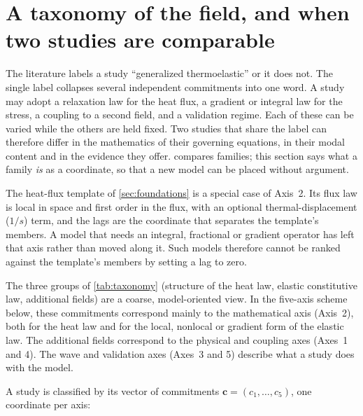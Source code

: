 \section{A taxonomy of the field, and when two studies are comparable}\label{sec:taxonomy}

The literature labels a study ``generalized thermoelastic'' or it does not. The single label collapses several independent commitments into one word. A study may adopt a relaxation law for the heat flux, a gradient or
integral law for the stress, a coupling to a second field, and a validation regime. Each of these can
be varied while the others are held fixed. Two studies that share the label can therefore differ in the
mathematics of their governing equations, in their modal content and in the evidence they offer.
 compares families; this section says what a family \emph{is} as a coordinate, so that a
new model can be placed without argument.

The heat-flux template of \cref{sec:foundations} is a special case of Axis~2. Its flux law is local in
space and first order in the flux, with an optional thermal-displacement ($1/s$) term, and the lags are the coordinate that separates the template's members. A
model that needs an integral, fractional or gradient operator has left that axis rather than moved along
it. Such models therefore cannot be ranked against the template's members by setting a lag to zero.

The three groups of \cref{tab:taxonomy} (structure of the heat law, elastic constitutive law, additional fields) are a coarse, model-oriented view. In the five-axis scheme below, these commitments correspond mainly to the mathematical axis (Axis~2), both for the heat law and for the local, nonlocal or gradient form of the elastic law. The additional fields correspond to the physical and coupling axes (Axes~1 and 4). The wave and validation axes (Axes~3 and 5) describe what a study does with the model.

A study is classified by its vector of commitments $\mathbf{c}=(c_1,\dots,c_5)$, one coordinate per axis:

